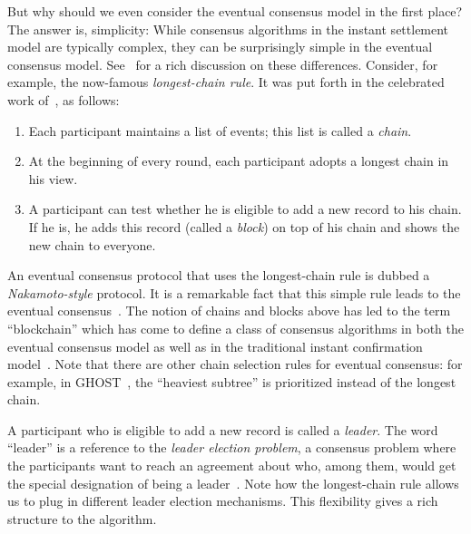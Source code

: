 But why should we even consider the eventual consensus model in the first place? 
The answer is, simplicity: 
While consensus algorithms in the instant settlement model 
are typically complex, 
they can be surprisingly simple in the eventual consensus model. 
See~\cite{GK18} for a rich discussion on these differences. 
Consider, for example, the now-famous \emph{longest-chain rule}. It was put forth in the 
celebrated work of~\citet{Nakamoto2008}, as follows:
\begin{enumerate}
  \item Each participant maintains a list of events; 
  this list is called a \emph{chain}.

  \item At the beginning of every round, 
  each participant adopts a longest chain in his view.

  \item A participant can test whether he is eligible to add a new record to his chain. 
  If he is, he adds this record (called a \emph{block}) on top of his chain 
  and shows the new chain to everyone.
\end{enumerate}

An eventual consensus protocol that uses the longest-chain rule is dubbed a \emph{Nakamoto-style} protocol.
It is a remarkable fact that this simple rule leads to the eventual consensus~\cite{GKL,PSS}. 
The notion of chains and blocks above has led to the term ``blockchain'' 
which has come to define a class of consensus algorithms 
in both the eventual consensus model as well as in the traditional 
instant confirmation model~\cite{ConsensusBlockchain,GK18}. 
Note that there are other chain selection rules for eventual consensus: 
for example, in GHOST~\cite{Ghost},
the ``heaviest subtree'' is prioritized instead of the longest chain. 

A participant who is eligible to add a new record is called a \emph{leader}. 
The word ``leader'' is a reference to the \emph{leader election problem}, 
a consensus problem where the participants want to 
reach an agreement about who, among them, would get 
the special designation of being a leader~\cite{RSZ,FeigeLeaderElection,BoppanaLeaderElection}.
Note how the longest-chain rule allows us to plug in 
different leader election mechanisms. 
This flexibility gives a rich structure to the algorithm.

